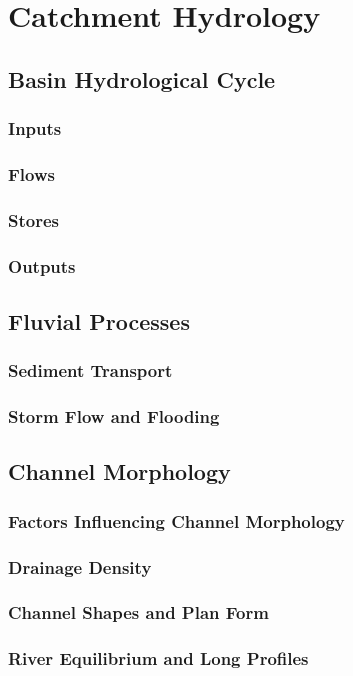 \documentclass[../main]{subfiles}
\begin{document}
\section{Catchment Hydrology}

	\subsection{Basin Hydrological Cycle}

	\subsubsection{Inputs}

	\subsubsection{Flows}

	\subsubsection{Stores}

	\subsubsection{Outputs}

	\subsection{Fluvial Processes}

	\subsubsection{Sediment Transport}

	\subsubsection{Storm Flow and Flooding}

	\subsection{Channel Morphology}

	\subsubsection{Factors Influencing Channel Morphology}

	\subsubsection{Drainage Density}

	\subsubsection{Channel Shapes and Plan Form}

	\subsubsection{River Equilibrium and Long Profiles}
\end{document}
